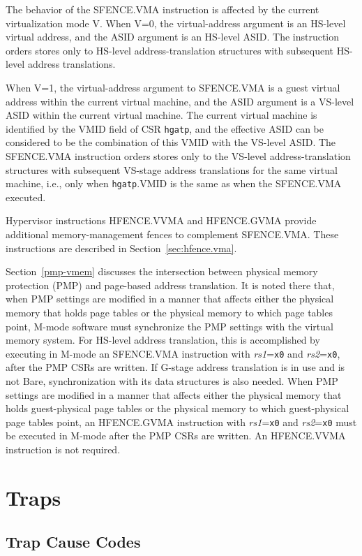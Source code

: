 The behavior of the SFENCE.VMA instruction is affected by the current
virtualization mode V.  When V=0, the virtual-address argument is an HS-level
virtual address, and the ASID argument is an HS-level ASID.
The instruction orders stores only to HS-level address-translation structures
with subsequent HS-level address translations.

When V=1, the virtual-address argument to SFENCE.VMA is a guest virtual
address within the current virtual machine, and the ASID argument is a VS-level
ASID within the current virtual machine.
The current virtual machine is identified by the VMID field of CSR {\tt hgatp},
and the effective ASID can be considered to be the combination of this VMID
with the VS-level ASID.
The SFENCE.VMA instruction orders stores only to the VS-level
address-translation structures with subsequent VS-stage address translations
for the same virtual machine, i.e., only when {\tt hgatp}.VMID is the same as
when the SFENCE.VMA executed.

Hypervisor instructions HFENCE.VVMA and HFENCE.GVMA provide additional
memory-management fences to complement SFENCE.VMA.
These instructions are described in Section~\ref{sec:hfence.vma}.

Section~\ref{pmp-vmem} discusses the intersection between physical memory
protection (PMP) and page-based address translation.
It is noted there that, when PMP settings are modified in a manner that affects
either the physical memory that holds page tables or the physical memory to
which page tables point, M-mode software must synchronize the PMP settings with
the virtual memory system.
For HS-level address translation, this is accomplished by executing in M-mode
an SFENCE.VMA instruction with {\em rs1}={\tt x0} and {\em rs2}={\tt x0}, after
the PMP CSRs are written.
If G-stage address translation is in use and is not Bare,
synchronization with its data
structures is also needed.
When PMP settings are modified in a manner that affects either the physical
memory that holds guest-physical page tables or the physical memory to which
guest-physical page tables point, an HFENCE.GVMA instruction with
{\em rs1}={\tt x0} and {\em rs2}={\tt x0} must be executed in M-mode after the
PMP CSRs are written.
An HFENCE.VVMA instruction is not required.

\section{Traps}

\subsection{Trap Cause Codes}


